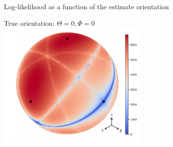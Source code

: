 \documentclass[presentation]{beamer}
\begin{document}
\begin{frame}[label=sec-7]{Log-likelihood as a function of the estimate orientation}
\begin{center}
True orientation: $\Theta = 0, \Phi = 0$\\
  \includegraphics[width=0.55\textwidth, interpolate=true]{figs/likelihood2.pdf}\\
\end{center}
\end{frame}
\end{document}
